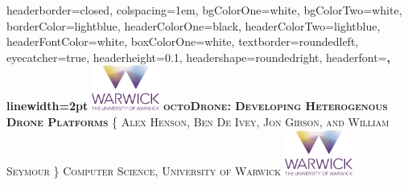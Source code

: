 \documentclass[landscape,a0paper,fontscale=0.285]{baposter} %
\begin{document}
\begin{poster}
{
headerborder=closed, %
colspacing=1em, %
bgColorOne=white, %
bgColorTwo=white, %
borderColor=lightblue, %
headerColorOne=black, %
headerColorTwo=lightblue, %
headerFontColor=white, %
boxColorOne=white, %
textborder=roundedleft, %
eyecatcher=true, %
headerheight=0.1\textheight, %
headershape=roundedright, %
headerfont=\Large\bf\textsc, %
linewidth=2pt %
}
%
{\includegraphics[height=4em]{logo.png}} %
{\bf\textsc{octoDrone: Developing Heterogenous Drone Platforms}\vspace{0.5em}} %
{\textsc{\{ Alex Henson, Ben De Ivey, Jon Gibson, and William Seymour \} \hspace{12pt} Computer Science, University of Warwick}} %
{\includegraphics[height=4em]{logo.png}} %



\end{poster}
\end{document}
